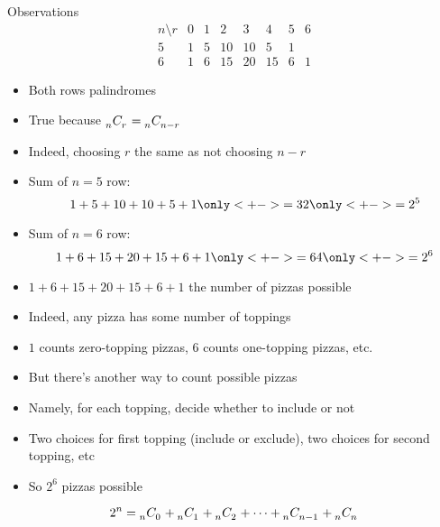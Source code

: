 \documentclass[handout]{beamer}
\theoremstyle{definition}
\newcommand\ncr[2]{\tensor[_{#1}]C{_{#2}}}
\begin{document}
\begin{frame}{Observations}
\[\begin{array}{c|ccccccc}
n\setminus r&0&1&2&3&4&5&6\\\hline
5&1&5&10&10&5&1\\
6&1&6&15&20&15&6&1
\end{array}\]
\begin{itemize}
\item Both rows palindromes
\item True because $\ncr{n}{r}=\ncr{n}{n-r}$
\item Indeed, choosing $r$ the same as \alert{not} choosing $n-r$
\item Sum of $n=5$ row:
\[1+5+10+10+5+1\only<+->{=32}\only<+->{=2^5}\]
\item Sum of $n=6$ row:
\[1+6+15+20+15+6+1\only<+->{=64}\only<+->{=2^6}\]
\end{itemize}
\end{frame}

\begin{frame}
\begin{itemize}
\item $1+6+15+20+15+6+1$ the number of pizzas possible
\item Indeed, any pizza has \alert{some} number of toppings
\item $1$ counts zero-topping pizzas, $6$ counts one-topping pizzas, etc.
\item But there's another way to count possible pizzas
\item Namely, for each topping, decide whether to include or not
\item Two choices for first topping (include or exclude), two choices for second
topping, etc
\item So $2^6$ pizzas possible
\end{itemize}
\begin{theorem}
\[2^n=\ncr{n}{0}+\ncr{n}{1}+\ncr{n}{2}+\cdots+\ncr{n}{n-1}+\ncr{n}{n}\]
\end{theorem}
\end{frame}
\end{document}
